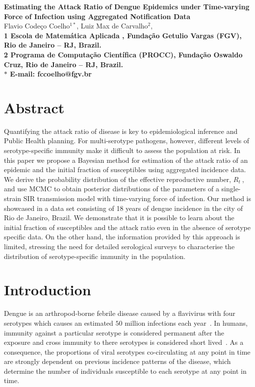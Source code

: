 \documentclass[10pt]{article}
\date{}
\def \rr {$R_{t}\:$}
\begin{document}
\begin{flushleft}
{\Large
\textbf{Estimating the Attack Ratio of Dengue Epidemics under Time-varying 
Force of Infection using Aggregated Notification Data}
}
\\
Flavio Code\c{c}o Coelho$^{1\ast}$, 
Luiz Max de Carvalho$^{2}$, 
\\
\bf{1} Escola de Matem\'atica Aplicada , Funda\c{c}\~ao Getulio Vargas (FGV), 
Rio de Janeiro -- RJ, Brazil.
\\
\bf{2} Programa de Computa\c{c}\~ao Cient\'ifica (PROCC), Funda\c{c}\~ao Oswaldo 
Cruz, Rio de Janeiro -- RJ, Brazil.
\\
$\ast$ E-mail: fccoelho@fgv.br
\end{flushleft}

\section*{Abstract}

Quantifying the attack ratio of disease is key to epidemiological inference and 
Public Health planning.
For multi-serotype pathogens, however, different levels of 
serotype-specific immunity make it difficult to assess the population at risk. 
In this paper we propose a Bayesian method for estimation of the attack ratio 
of an epidemic and the initial fraction of susceptibles using aggregated 
incidence data. 
We derive the probability distribution of the effective reproductive number, 
\rr, and use MCMC to obtain posterior 
distributions of the parameters of a single-strain SIR transmission model with 
time-varying force of infection.
Our method is showcased in a data set consisting of 18 years of dengue 
incidence in the city of Rio de Janeiro, Brazil.
We demonstrate that it is possible to learn about the initial fraction of 
susceptibles and the attack ratio even in the absence of serotype specific data.
On the other hand, the information provided by this approach is limited, 
stressing the need for detailed serological surveys to characterise the 
distribution of serotype-specific immunity in the population.

\section*{Introduction}

Dengue is an arthropod-borne febrile disease caused by a flavivirus with four 
serotypes which causes an estimated  $50$ million infections each 
year~\cite{Guzman2010}.
In humans, immunity against  a particular serotype is  considered permanent 
after the exposure and cross immunity to there serotypes is considered short 
lived~\cite{halstead_dengue_2007}.
As a consequence, the proportions of viral serotypes co-circulating at any 
point in time are strongly dependent on previous incidence patterns of the 
disease, which determine the number of individuals susceptible to each serotype 
at any point in time.
\end{document}
